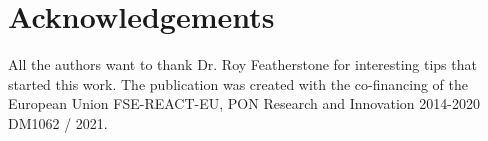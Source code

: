 \documentclass[letterpaper, 10 pt, conference]{ieeeconf}      %
\begin{document}
\small
\section*{Acknowledgements}	
All the authors want to thank Dr. Roy Featherstone for interesting tips that started this work. 
\newline
The publication was created with the co-financing of the European Union FSE-REACT-EU, PON Research and Innovation 2014-2020 DM1062 / 2021.


\end{document}
